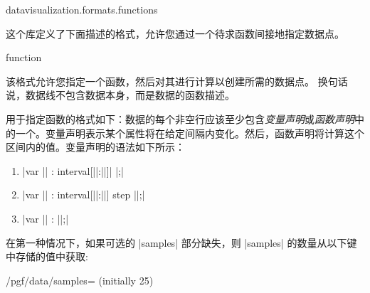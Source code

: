 \begin{tikzlibrary}{datavisualization.formats.functions}

    这个库定义了下面描述的格式，允许您通过一个待求函数间接地指定数据点。

    \begin{dataformat}{function}

        该格式允许您指定一个函数，然后对其进行计算以创建所需的数据点。 换句话说，数据线不包含数据本身，而是数据的函数描述。


        用于指定函数的格式如下：数据的每个非空行应该至少包含\emph{变量声明}或\emph{函数声明}中的一个。变量声明表示某个属性将在给定间隔内变化。然后，函数声明将计算这个区间内的值。变量声明的语法如下所示：
        \begin{enumerate}
            \item |var || : interval[||:||]| |;|
            \item |var || : interval[||:||] step ||;|
            \item |var || : {||};|
        \end{enumerate}
        在第一种情况下，如果可选的 |samples| 部分缺失，则 |samples| 的数量从以下键中存储的值中获取:
        \begin{key}{/pgf/data/samples= (initially 25)} %


\end{key}
\end{dataformat}
\end{tikzlibrary}
